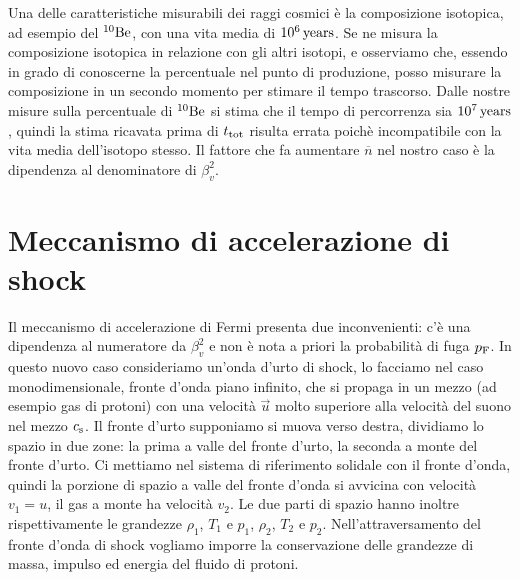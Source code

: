 Una delle caratteristiche misurabili dei raggi cosmici è la composizione isotopica, ad esempio del $^{10}\textup{Be}$, con una vita media di $10^6\,\textup{years}$. Se ne misura la composizione isotopica in relazione con gli altri isotopi, e osserviamo che, essendo in grado di conoscerne la percentuale nel punto di produzione, posso misurare la composizione in un secondo momento per stimare il tempo trascorso. Dalle nostre misure sulla percentuale di $^{10}\textup{Be}$ si stima che il tempo di percorrenza sia $10^7\,\textup{years}$, quindi la stima ricavata prima di $t_\textup{tot}$ risulta errata poichè incompatibile con la vita media dell'isotopo stesso.
Il fattore che fa aumentare $\overline{n}$ nel nostro caso è la dipendenza al denominatore di $\beta_v^2$.

\section{Meccanismo di accelerazione di shock}
Il meccanismo di accelerazione di Fermi presenta due inconvenienti: c'è una dipendenza al numeratore da $\beta_v^2$ e non è nota a priori la probabilità di fuga $p_\textup{F}$. In questo nuovo caso consideriamo un'onda d'urto di shock, lo facciamo nel caso monodimensionale, fronte d'onda piano infinito, che si propaga in un mezzo (ad esempio gas di protoni) con una velocità $\vec{u}$ molto superiore alla velocità del suono nel mezzo $c_\textup{s}$. Il fronte d'urto supponiamo si muova verso destra, dividiamo lo spazio in due zone: la prima a valle del fronte d'urto, la seconda a monte del fronte d'urto. Ci mettiamo nel sistema di riferimento solidale con il fronte d'onda, quindi la porzione di spazio a valle del fronte d'onda si avvicina con velocità $v_1 = u$, il gas a monte ha velocità $v_2$. Le due parti di spazio hanno inoltre rispettivamente le grandezze $\rho_1$, $T_1$ e $p_1$, $\rho_2$, $T_2$ e $p_2$. Nell'attraversamento del fronte d'onda di shock vogliamo imporre la conservazione delle grandezze di massa, impulso ed energia del fluido di protoni.

